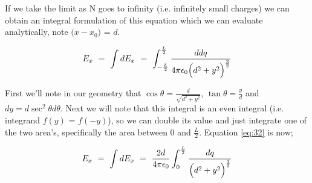 \documentclass{article}
\begin{document}
If we take the limit as N goes to infinity (i.e. infinitely small charges) we can obtain an integral formulation of this equation which we can evaluate analytically, note \begin{math} \big(x - x_0\big) \end{math} =  \begin{math} d \end{math}. 

\begin{equation} \label{eq:32}
E_x \hspace{0.125cm} = \hspace{0.125cm} \int dE_{x} \hspace{0.125cm} = \hspace{0.125cm} \int_{-\frac{L}{2}}^{\frac{L}{2}} \frac{d dq }{4\pi \epsilon_{0} \Big( d^2 + y^2 \Big)^{\frac{3}{2}}}
\end{equation}

First we'll note in our geometry that \begin{math} \cos{\theta} = \frac{d}{\sqrt{d^2 + y^2}} \end{math}, \begin{math} \tan{\theta} = \frac{y}{d} \end{math} and \begin{math} dy = d\sec^{2}{\theta}d\theta \end{math}. Next we will note that this integral is an even integral (i.e. integrand \begin{math} f(y) \end{math} = \begin{math} f(-y) \end{math}), so we can double its value and just integrate one of the two area's, specifically the area between \begin{math} 0 \end{math} and \begin{math} \frac{L}{2} \end{math}. Equation \ref{eq:32} is now;

\begin{equation} \label{eq:33}
E_x \hspace{0.125cm} = \hspace{0.125cm} \int dE_{x} \hspace{0.125cm} = \hspace{0.125cm} \frac{2d}{4\pi \epsilon_{0}} \int_{0}^{\frac{L}{2}} \frac{dq}{ \Big( d^2 + y^2 \Big)^{\frac{3}{2}}}
\end{equation}
\end{document}
